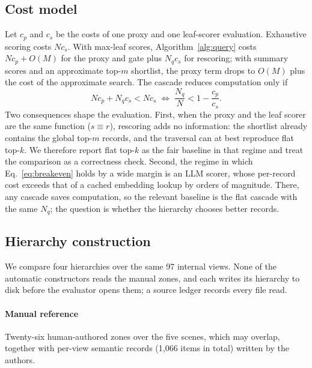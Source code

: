 \documentclass{ieeeaccess}
\begin{document}
\subsection{Cost model}
\label{sec:complexity}
Let $c_p$ and $c_s$ be the costs of one proxy and one leaf-scorer evaluation.
Exhaustive scoring costs $Nc_s$. With max-leaf scores, Algorithm~\ref{alg:query}
costs $Nc_p+O(M)$ for the proxy and gate plus $N_qc_s$ for rescoring; with
summary scores and an approximate top-$m$ shortlist, the proxy term drops to
$O(M)$ plus the cost of the approximate search. The cascade reduces computation
only if
\begin{equation}
 Nc_p+N_qc_s<Nc_s
 \;\Longleftrightarrow\;
 \frac{N_q}{N}<1-\frac{c_p}{c_s}.
 \label{eq:breakeven}
\end{equation}
Two consequences shape the evaluation. First, when the proxy and the leaf scorer
are the same function ($s\equiv r$), rescoring adds no information: the shortlist
already contains the global top-$m$ records, and the traversal can at best
reproduce flat top-$k$. We therefore report flat top-$k$ as the fair baseline in
that regime and treat the comparison as a correctness check. Second, the regime
in which Eq.~\eqref{eq:breakeven} holds by a wide margin is an LLM scorer, whose
per-record cost exceeds that of a cached embedding lookup by orders of magnitude.
There, any cascade saves computation, so the relevant baseline is the flat
cascade with the same $N_q$; the question is whether the hierarchy chooses
better records.

\subsection{Hierarchy construction}
\label{sec:construction}
We compare four hierarchies over the same 97 internal views. None of the
automatic constructors reads the manual zones, and each writes its hierarchy to
disk before the evaluator opens them; a source ledger records every file read.

\paragraph{Manual reference}
Twenty-six human-authored zones over the five scenes, which may overlap, together
with per-view semantic records (1,066 items in total) written by the authors.
\end{document}
